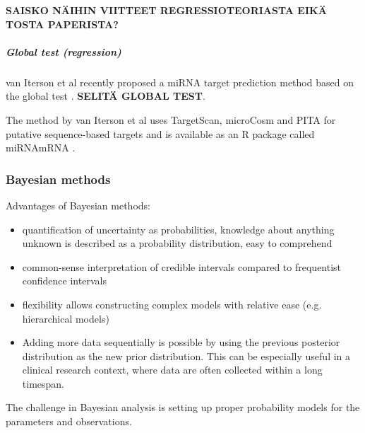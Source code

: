 \textbf{SAISKO NÄIHIN VIITTEET REGRESSIOTEORIASTA EIKÄ TOSTA PAPERISTA?}


\subparagraph{Global test (regression)}\label{global-test-regression}

van Iterson et al recently proposed a miRNA target prediction method based on
the global test \cite{vanIterson2013}. \textbf{SELITÄ GLOBAL TEST}.

The method by van Iterson et al uses TargetScan, microCosm and PITA for
putative sequence-based targets and is available as an R package called
miRNAmRNA \cite{vanItersonWeb}.





\subsubsection{Bayesian methods}\label{bayesian-methods}

Advantages of Bayesian methods:
\begin{itemize}
\tightlist
\item quantification of uncertainty as probabilities, knowledge about anything
  unknown is described as a probability distribution, easy to comprehend
\item
  common-sense interpretation of credible intervals compared to frequentist
  confidence intervals
\item
  flexibility allows constructing complex models with relative ease (e.g.
  hierarchical models)
\item
  Adding more data sequentially is possible by using the previous posterior
  distribution as the new prior distribution. This can be especially useful in
  a clinical research context, where data are often collected within a long
  timespan.
\end{itemize}
The challenge in Bayesian analysis is setting up proper probability models for
the parameters and observations.

